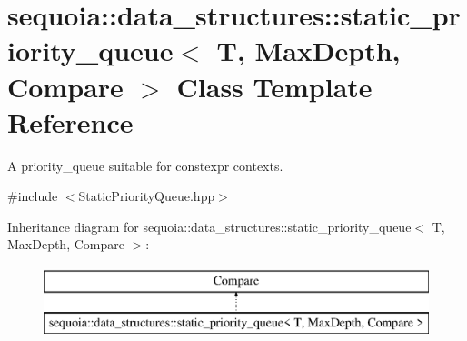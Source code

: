 \hypertarget{classsequoia_1_1data__structures_1_1static__priority__queue}{}\section{sequoia\+::data\+\_\+structures\+::static\+\_\+priority\+\_\+queue$<$ T, Max\+Depth, Compare $>$ Class Template Reference}
\label{classsequoia_1_1data__structures_1_1static__priority__queue}


A priority\+\_\+queue suitable for constexpr contexts.  




{\ttfamily \#include $<$Static\+Priority\+Queue.\+hpp$>$}

Inheritance diagram for sequoia\+::data\+\_\+structures\+::static\+\_\+priority\+\_\+queue$<$ T, Max\+Depth, Compare $>$\+:\begin{figure}[H]
\begin{center}
\leavevmode
\includegraphics[height=2.000000cm]{classsequoia_1_1data__structures_1_1static__priority__queue}
\end{center}
\end{figure}
